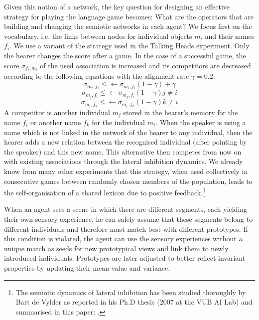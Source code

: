Given this notion of a network, the key question for designing an effective 
strategy for playing the language game becomes: What are the operators that are building and
changing the semiotic networks in each agent? We focus first on the
vocabulary, i.e. the links between nodes for individual objects $m_i$ and their 
names $f_i$. We use a variant of the strategy used in the Talking Heads experiment. 
Only the hearer changes the score after a game. 
In the case of a successful game, the score $\sigma_{f_i,m_i}$ of the used association is 
increased and its competitors are decreased according to the following
equations with the alignment rate $\gamma = 0.2$: 
\begin{equation}
 \sigma_{m_i,f_i} ≤\leftarrow \sigma_{m_i,f_i} (1-\gamma) + \gamma
\end{equation}
\begin{equation}
 \sigma_{m_j,f_i} ≤\leftarrow \sigma_{m_j,f_i} (1-\gamma) j \neq i
\end{equation}
\begin{equation}
 \sigma_{m_i,f_k} ≤\leftarrow \sigma_{m_i,f_k} (1-\gamma) k \neq i
\end{equation}
A competitor is another individual $m_j$ stored in the hearer's memory 
for the name $f_i$ or another name $f_k$ for the individual 
$m_i$. When the speaker is using a name which is not linked in the network 
of the hearer to any individual, then the hearer adds a new relation between 
the recognised individual (after pointing by the speaker) and this new name. 
This alternative then competes from 
now on with existing associations through the lateral inhibition dynamics. 
We already know from many other experiments that this strategy, when used collectively in 
consecutive games between randomly chosen members of the population, leads to the  
self-organisation of a shared lexicon due to positive feedback.\footnote{
The semiotic dynamics of lateral inhibition has been studied thoroughly by Bart de Vylder as reported in his Ph.D thesis 
(2007 at the VUB AI Lab) and summarised in this paper: \cite{deVylder:2006}.}
 
When an agent sees a scene in which there are different segments, each yielding their own sensory
experience, he can safely assume that these segments belong to 
different individuals and therefore must match best with 
different prototypes. If this condition is violated, the agent
can use the sensory experiences without a unique match as seeds for new
prototypical views and link them to newly introduced individuals.  
Prototypes are later adjusted to better reflect invariant properties by updating their 
mean value and variance. 


